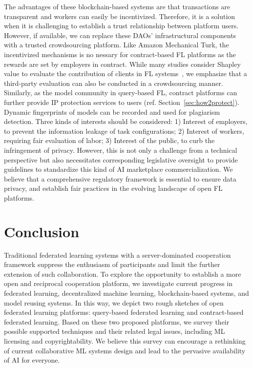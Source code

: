 The advantages of these blockchain-based systems are that transactions are transparent and workers can easily be incentivized.
Therefore, it is a solution when it is challenging to establish a trust relationship between platform users. 
However, if available, we can replace these DAOs' infrastructural components with a trusted crowdsourcing platform.
Like Amazon Mechanical Turk, the incentivized mechanisms is no nessary for contract-based FL platforms as the rewards are set by employers in contract.
While many studies consider Shapley value to evaluate the contribution of clients in FL systems~\cite{zhan2021survey}, we emphasize that a third-party evaluation can also be conducted in a crowdsourcing manner.
Similarly, as the model community in query-based FL, contract platforms can further provide IP protection services to users (ref. Section~\ref{sec:how2protect}). 
Dynamic fingerprints of models can be recorded and used for plagiarism detection.
Three kinds of interests should be considered: 1) Interest of employers, to prevent the information leakage of task configurations; 2) Interest of workers, requiring fair evaluation of labor; 3) Interest of the public, to curb the infringement of privacy.
However, this is not only a challenge from a technical perspective but also necessitates corresponding legislative oversight to provide guidelines to standardize this kind of AI marketplace commercialization.
We believe that a comprehensive regulatory framework is essential to ensure data privacy, and establish fair practices in the evolving landscape of open FL platforms.


\section{Conclusion}
Traditional federated learning systems with a server-dominated cooperation framework suppress the enthusiasm of participants and limit the further extension of such collaboration. 
To explore the opportunity to establish a more open and reciprocal cooperation platform, we investigate current progress in federated learning, decentralized machine learning, blockchain-based systems, and model reusing systems. 
In this way, we depict two rough sketches of open federated learning platforms: query-based federated learning and contract-based federated learning. 
Based on these two proposed platforms, we survey their possible supported techniques and their related legal issues, including ML licensing and copyrightability. 
We believe this survey can encourage a rethinking of current collaborative ML systems design and lead to the pervasive availability of AI for everyone.






